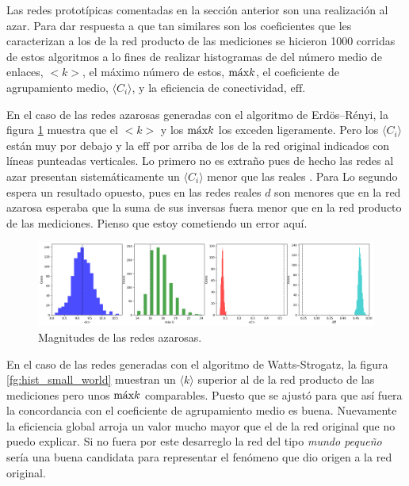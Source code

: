 \documentclass{article}
\begin{document}
Las redes prototípicas comentadas en la sección anterior son una realización al azar.
Para dar respuesta a que tan similares son los coeficientes que les caracterizan a los de la red producto de las mediciones se hicieron 1000 corridas de estos algoritmos a lo fines de realizar histogramas de del número medio de enlaces, $<k>$, el máximo número de estos, $\textnormal{máx} k$, el coeficiente de agrupamiento medio, $\langle C_i \rangle$, y la eficiencia de conectividad, $\mathrm{eff}$.

En el caso de las redes azarosas generadas con el algoritmo de Erdös–Rényi, la figura \ref{fg:hist_poisson} muestra que el $<k>$ y los $\textnormal{máx} k$ los exceden ligeramente.
Pero los $\langle C_i \rangle$ están muy por debajo y la $\mathrm{eff}$ por arriba de los de la red original indicados con líneas punteadas verticales.
Lo primero no es extraño pues de hecho las redes al azar presentan sistemáticamente un $\langle C_i \rangle$ menor que las reales \cite[sección 3.9]{albert-laszlo_barabasi_network_2016}.
Para Lo segundo espera un resultado opuesto, pues en las redes reales $d$ son menores que en la red azarosa esperaba que la suma de sus inversas fuera menor que en la red producto de las mediciones.
Pienso que estoy cometiendo un error aquí.

\begin{figure}[ht]
  \centering
  \includegraphics[width= \linewidth]{hist_poisson}
  \caption{Magnitudes de las redes azarosas.}
	\label{fg:hist_poisson}
\end{figure}

En el caso de las redes generadas con el algoritmo de Watts-Strogatz, la figura \ref{fg:hist_small_world} muestran un $\langle k \rangle$ superior al de la red producto de las mediciones pero unos $\textnormal{máx} k$ comparables.
Puesto que se ajustó para que así fuera la concordancia con el coeficiente de agrupamiento medio es buena.
Nuevamente la eficiencia global arroja un valor mucho mayor que el de la red original que no puedo explicar.
Si no fuera por este desarreglo la red del tipo \emph{mundo pequeño} sería una buena candidata para representar el fenómeno que dio origen a la red original.
\end{document}
